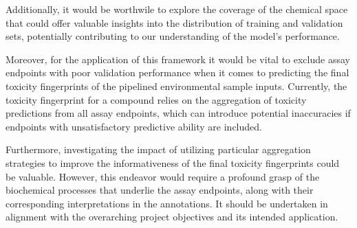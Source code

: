 Additionally, it would be worthwile to explore the coverage of the chemical space that could offer valuable insights into the distribution of training and validation sets, potentially contributing to our understanding of the model's performance.

Moreover, for the application of this framework it would be vital to exclude assay endpoints with poor validation performance when it comes to predicting the final toxicity fingerprints of the pipelined environmental sample inputs. Currently, the toxicity fingerprint for a compound relies on the aggregation of toxicity predictions from all assay endpoints, which can introduce potential inaccuracies if endpoints with unsatisfactory predictive ability are included. 

Furthermore, investigating the impact of utilizing particular aggregation strategies to improve the informativeness of the final toxicity fingerprints could be valuable. However, this endeavor would require a profound grasp of the biochemical processes that underlie the assay endpoints, along with their corresponding interpretations in the annotations. It should be undertaken in alignment with the overarching project objectives and its intended application.
